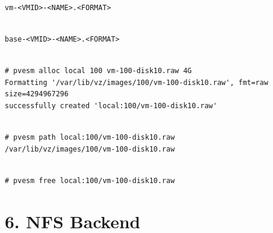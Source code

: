 \begin{lstlisting}

vm-<VMID>-<NAME>.<FORMAT>

\end{lstlisting}

\begin{lstlisting}

base-<VMID>-<NAME>.<FORMAT>

\end{lstlisting}

\begin{lstlisting}

# pvesm alloc local 100 vm-100-disk10.raw 4G
Formatting '/var/lib/vz/images/100/vm-100-disk10.raw', fmt=raw size=4294967296
successfully created 'local:100/vm-100-disk10.raw'

\end{lstlisting}

\begin{lstlisting}

# pvesm path local:100/vm-100-disk10.raw
/var/lib/vz/images/100/vm-100-disk10.raw

\end{lstlisting}

\begin{lstlisting}

# pvesm free local:100/vm-100-disk10.raw

\end{lstlisting}

\begin{table}[htbp]

\centering

\begin{tabular}

\end{tabular}

\end{table}

\begin{table}[htbp]

\centering

\begin{tabular}

\end{tabular}

\end{table}


\section{6. NFS Backend}

